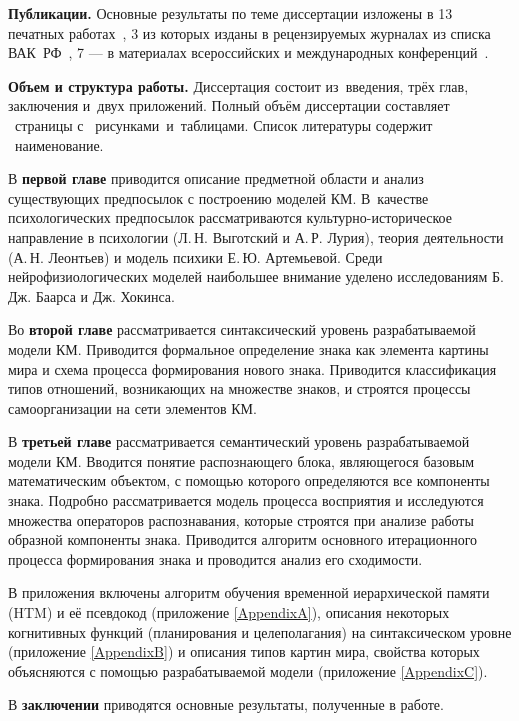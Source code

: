 \textbf{Публикации.} Основные результаты по теме диссертации изложены в 13 печатных работах~\cite{PanovA2011,PanovA2012a,PanovA2012b,PanovA2012c,PanovA2013b,PanovA2014a,PanovT2010b,PanovT2012a,PanovT2012b,PanovT2013,PanovT2014a,PanovT2014b,PanovA2014c}, 3 из которых изданы в рецензируемых журналах из списка ВАК~РФ~\cite{PanovA2012c,PanovA2013b,PanovA2014a}, 7 --- в материалах всероссийских и международных конференций~\cite{PanovA2011,PanovA2012a,PanovA2012b,PanovT2010b,PanovT2012b,PanovT2014a,PanovT2014b}.

\textbf{Объем и структура работы.} Диссертация состоит из~введения, трёх глав, заключения и~двух приложений. Полный объём диссертации составляет \totalpages\ страницы с \totalfigures\ рисунками\iftotaltables\ и\totaltables\ таблицами\fi. Список литературы содержит \totalcitnums\ наименование.

В \textbf{первой главе} приводится описание предметной области и анализ существующих предпосылок с построению моделей КМ. В~качестве психологических предпосылок рассматриваются культурно-историческое направление в психологии (Л.\,Н. Выготский и А.\,Р. Лурия), теория деятельности (А.\,Н. Леонтьев) и модель психики Е.\,Ю. Артемьевой. Среди нейрофизиологических моделей наибольшее внимание уделено исследованиям Б.\,Дж. Баарса и Дж. Хокинса.

Во \textbf{второй главе} рассматривается синтаксический уровень разрабатываемой модели КМ. Приводится формальное определение знака как элемента картины мира и схема процесса формирования нового знака. Приводится классификация типов отношений, возникающих на множестве знаков, и строятся процессы самоорганизации на сети элементов КМ.

В \textbf{третьей главе} рассматривается семантический уровень разрабатываемой модели КМ. Вводится понятие распознающего блока, являющегося базовым математическим объектом, с помощью которого определяются все компоненты знака. Подробно рассматривается модель процесса восприятия и исследуются множества операторов распознавания, которые строятся при анализе работы образной компоненты знака. Приводится алгоритм основного итерационного процесса формирования знака и проводится анализ его сходимости.

В приложения включены алгоритм обучения временной иерархической памяти (HTM) и её псевдокод (приложение \ref{AppendixA}), описания некоторых когнитивных функций (планирования и целеполагания) на синтаксическом уровне (приложение \ref{AppendixB}) и описания типов картин мира, свойства которых объясняются с помощью разрабатываемой модели (приложение \ref{AppendixC}).

В \textbf{заключении} приводятся основные результаты, полученные в работе.
\clearpage